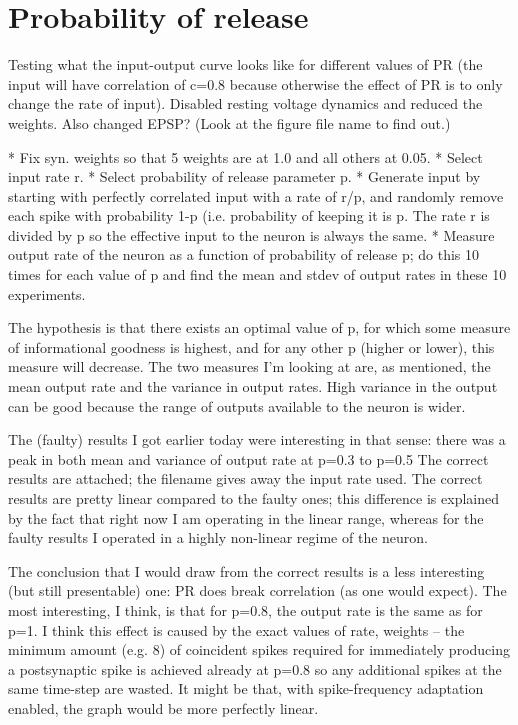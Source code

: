 \documentclass[a4paper,12pt]{report}
\theoremstyle{definition}
\begin{document}
\clearpage %
\section{Probability of release} %

Testing what the input-output curve looks like for different values of PR (the input will have correlation of c=0.8 because otherwise the effect of PR is to only change the rate of input).
Disabled resting voltage dynamics and reduced the weights. Also changed EPSP? (Look at the figure file name to find out.)

* Fix syn. weights so that 5 weights are at 1.0 and all others at 0.05.
* Select input rate r.
* Select probability of release parameter p.
* Generate input by starting with perfectly correlated input with a rate of r/p, and randomly remove each spike with probability 1-p (i.e. probability of keeping it is p. The rate r is divided by p so the effective input to the neuron is always the same.
* Measure output rate of the neuron as a function of probability of release p; do this 10 times for each value of p and find the mean and stdev of output rates in these 10 experiments.

The hypothesis is that there exists an optimal value of p, for which some measure of informational goodness is highest, and for any other p (higher or lower), this measure will decrease.
The two measures I'm looking at are, as mentioned, the mean output rate and the variance in output rates. High variance in the output can be good because the range of outputs available to the neuron is wider.

The (faulty) results I got earlier today were interesting in that sense: there was a peak in both mean and variance of output rate at p=0.3 to p=0.5 The correct results are attached; the filename gives away the input rate used. The correct results are pretty linear compared to the faulty ones; this difference is explained by the fact that right now I am operating in the linear range, whereas for the faulty results I operated in a highly non-linear regime of the neuron.

The conclusion that I would draw from the correct results is a less interesting (but still presentable) one: PR does break correlation (as one would expect). The most interesting, I think, is that for p=0.8, the output rate is the same as for p=1.
I think this effect is caused by the exact values of {rate, weights} -- the minimum amount (e.g. 8) of coincident spikes required for immediately producing a postsynaptic spike is achieved already at p=0.8 so any additional spikes at the same time-step are wasted. It might be that, with spike-frequency adaptation enabled, the graph would be more perfectly linear.
\end{document}
